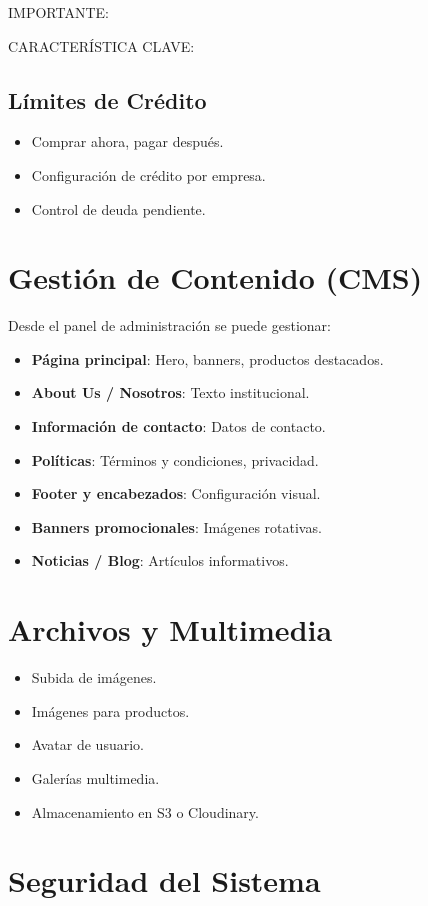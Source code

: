 \documentclass[12pt,a4paper,oneside]{book}
\begin{document}
\begin{alert}{IMPORTANTE:}
\begin{info}{CARACTERÍSTICA CLAVE:}
\subsection{Límites de Crédito}
\begin{itemize}
    \item Comprar ahora, pagar después.
    \item Configuración de crédito por empresa.
    \item Control de deuda pendiente.
\end{itemize}

\section{Gestión de Contenido (CMS)}
\label{sec:cms}

Desde el panel de administración se puede gestionar:

\begin{itemize}
    \item \textbf{Página principal}: Hero, banners, productos destacados.
    \item \textbf{About Us / Nosotros}: Texto institucional.
    \item \textbf{Información de contacto}: Datos de contacto.
    \item \textbf{Políticas}: Términos y condiciones, privacidad.
    \item \textbf{Footer y encabezados}: Configuración visual.
    \item \textbf{Banners promocionales}: Imágenes rotativas.
    \item \textbf{Noticias / Blog}: Artículos informativos.
\end{itemize}

\section{Archivos y Multimedia}
\label{sec:archivos}

\begin{itemize}
    \item Subida de imágenes.
    \item Imágenes para productos.
    \item Avatar de usuario.
    \item Galerías multimedia.
    \item Almacenamiento en S3 o Cloudinary.
\end{itemize}

\section{Seguridad del Sistema}
\label{sec:seguridad}


\end{info}
\end{alert}
\end{document}
